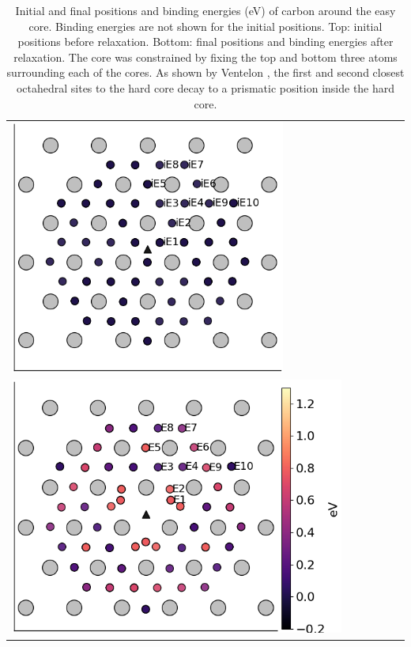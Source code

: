 \documentclass[a4paper,11pt]{article}
\begin{document}
\begin{table}	
    \begin{tabular}{l}
 	          \includegraphics[width=0.7\textwidth]{../Images/easy_core_fe_C_initial_positioning.png}  \\
 	          \includegraphics[width=0.85\textwidth]{../Images/easy_core_fe_C_positioning_energies_e10_label.png}  \\

     	     \end{tabular}		
\caption{ Initial and final positions and binding energies (eV) of carbon around the easy core. Binding energies are not shown for the initial positions. Top: initial positions before relaxation. Bottom: final positions and binding energies after relaxation. The core was constrained by fixing the top and bottom three atoms surrounding each of the cores. As shown by Ventelon \cite{Ventelon2015}, the first and second closest octahedral sites to the hard core decay to a prismatic position inside the hard core. }
\label{easybindingenergydist}
   \end{table}
\end{document}
